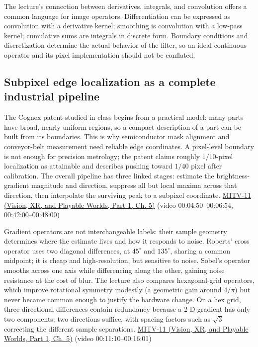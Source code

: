 The lecture's connection between derivatives, integrals, and convolution offers a common language for image operators. Differentiation can be expressed as convolution with a derivative kernel; smoothing is convolution with a low-pass kernel; cumulative sums are integrals in discrete form. Boundary conditions and discretization determine the actual behavior of the filter, so an ideal continuous operator and its pixel implementation should not be conflated.

\subsection{Subpixel edge localization as a complete industrial pipeline}\label{04-visual-computing-ii-ch030-subpixel-edge-localization-as-a-complete-industrial-pipeline}

\hypertarget{04-visual-computing-ii-ch030-subpixel-edge-localization-as-a-complete-industrial-pipeline}{}

The Cognex patent studied in class begins from a practical model: many parts have broad, nearly uniform regions, so a compact description of a part can be built from its boundaries. This is why semiconductor mask alignment and conveyor-belt measurement need reliable edge coordinates. A pixel-level boundary is not enough for precision metrology; the patent claims roughly \(1/10\)-pixel localization as attainable and describes pushing toward \(1/40\) pixel after calibration. The overall pipeline has three linked stages: estimate the brightness-gradient magnitude and direction, suppress all but local maxima across that direction, then interpolate the surviving peak to a subpixel coordinate. \href{../07-Vision-XR-and-Playable-Worlds-P01/main.pdf\#nameddest=04-visual-computing-ii-ch036-mitv-11---edge-detection-subpixel-position-cordic-line-detection-us-6408109}{MITV-11 (Vision, XR, and Playable Worlds, Part 1, Ch. 5)} (video 00:04:50--00:06:54, 00:42:00--00:48:00)

Gradient operators are not interchangeable labels: their sample geometry determines where the estimate lives and how it responds to noise. Roberts' cross operator uses two diagonal differences, at \(45^\circ\) and \(135^\circ\), sharing a common midpoint; it is cheap and high-resolution, but sensitive to noise. Sobel's operator smooths across one axis while differencing along the other, gaining noise resistance at the cost of blur. The lecture also compares hexagonal-grid operators, which improve rotational symmetry modestly (a geometric gain around \(4/\pi\)) but never became common enough to justify the hardware change. On a hex grid, three directional differences contain redundancy because a 2-D gradient has only two components; two directions suffice, with spacing factors such as \(\sqrt3\) correcting the different sample separations. \href{../07-Vision-XR-and-Playable-Worlds-P01/main.pdf\#nameddest=04-visual-computing-ii-ch036-mitv-11---edge-detection-subpixel-position-cordic-line-detection-us-6408109}{MITV-11 (Vision, XR, and Playable Worlds, Part 1, Ch. 5)} (video 00:11:10--00:16:01)

